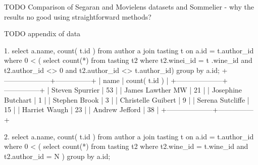 TODO Comparison of Segaran and Movielens datasets and Sommelier - why the results no good using straightforward methods?


TODO appendix of data


1. select a.name, count( t.id ) from author a join tasting t on a.id = t.author\_id where 0 < ( select count(*) from tasting t2 where t2.winei\_id = t
.wine\_id and t2.author\_id <> 0 and t2.author\_id <> t.author\_id)  group by a.id;                                                                        
+--------------------+---------------+
| name               | count( t.id ) |
+--------------------+---------------+
| Steven Spurrier    |            53 |
| James Lawther MW   |            21 |
| Josephine Butchart |             1 |
| Stephen Brook      |             3 |
| Christelle Guibert |             9 |
| Serena Sutcliffe   |            15 |
| Harriet Waugh      |            23 |
| Andrew Jefford     |            38 |
+--------------------+---------------+

2. select a.name, count( t.id ) from author a join tasting t on a.id = t.author\_id where 0 < ( select count(*) from tasting t2 where t2.wine\_id = t.wine\_id and t2.author\_id = {N} ) group by a.id; 

